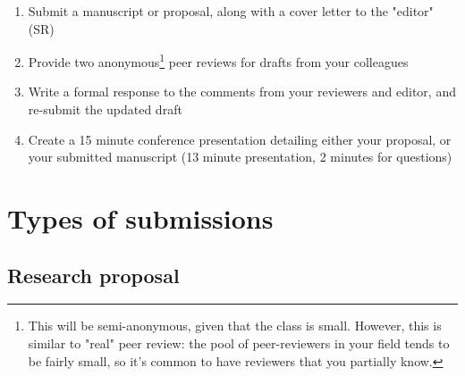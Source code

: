 \documentclass[11pt]{article}
\begin{document}
\begin{enumerate}
\item Submit a manuscript or proposal, along with a cover letter to the "editor" (SR)
\item Provide two anonymous\footnote{This will be semi-anonymous, given that the class is small. However, this is similar to "real" peer review: the pool of peer-reviewers in your field tends to be fairly small, so it's common to have reviewers that you partially know.} peer reviews for drafts from your colleagues
\item Write a formal response to the comments from your reviewers and editor, and re-submit the updated draft
\item Create a 15 minute conference presentation detailing either your proposal, or your submitted manuscript (13 minute presentation, 2 minutes for questions)
\end{enumerate}

\section*{Types of submissions}

\subsection*{Research proposal}
\end{document}
